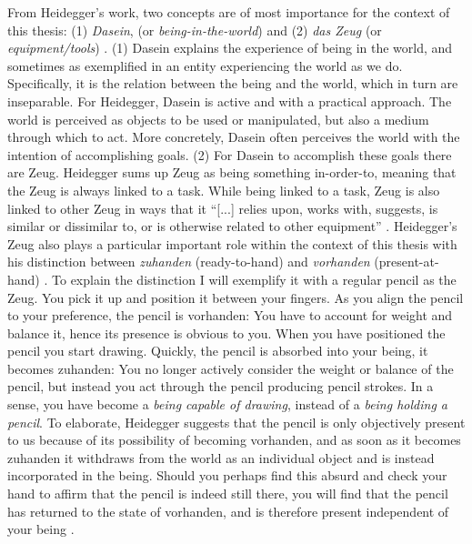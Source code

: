 From Heidegger's work, two concepts are of most importance for the context of this thesis: (1) \textit{Dasein}, (or \textit{being-in-the-world}) and (2) \textit{das Zeug} (or \textit{equipment/tools}) \cite{heidegger}.
(1) Dasein explains the experience of being in the world, and sometimes as exemplified in an entity experiencing the world as we do. Specifically, it is the relation between the being and the world, which in turn are inseparable. For Heidegger, Dasein is active and with a practical approach. The world is perceived as objects to be used or manipulated, but also a medium through which to act. More concretely, Dasein often perceives the world with the intention of accomplishing goals.
(2) For Dasein to accomplish these goals there are Zeug. Heidegger sums up Zeug as being something in-order-to, meaning that the Zeug is always linked to a task. While being linked to a task, Zeug is also linked to other Zeug in ways that it ``[...] relies upon, works with, suggests, is similar or dissimilar to, or is otherwise related to other equipment'' \cite[p. 109]{dourish}. Heidegger's Zeug also plays a particular important role within the context of this thesis with his distinction between \textit{zuhanden} (ready-to-hand) and \textit{vorhanden} (present-at-hand) \cite{heidegger}. To explain the distinction I will exemplify it with a regular pencil as the Zeug. You pick it up and position it between your fingers. As you align the pencil to your preference, the pencil is vorhanden: You have to account for weight and balance it, hence its presence is obvious to you. When you have positioned the pencil you start drawing. Quickly, the pencil is absorbed into your being, it becomes zuhanden: You no longer actively consider the weight or balance of the pencil, but instead you act through the pencil producing pencil strokes. In a sense, you have become a \textit{being capable of drawing}, instead of a \textit{being holding a pencil}. To elaborate, Heidegger suggests that the pencil is only objectively present to us because of its possibility of becoming vorhanden, and as soon as it becomes zuhanden it withdraws from the world as an individual object and is instead incorporated in the being. Should you perhaps find this absurd and check your hand to affirm that the pencil is indeed still there, you will find that the pencil has returned to the state of vorhanden, and is therefore present independent of your being \cite{dourish}.

